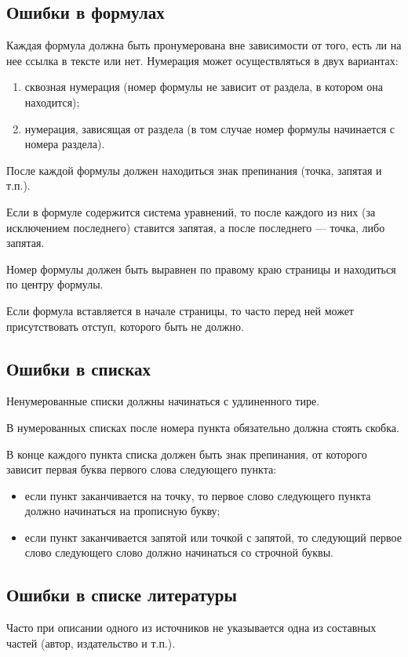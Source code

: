 \subsection{Ошибки в формулах}
Каждая формула должна быть пронумерована вне зависимости от того, есть ли на нее ссылка в тексте или нет. Нумерация может осуществляться в двух вариантах:
\begin{enumerate}
	\item сквозная нумерация (номер формулы не зависит от раздела, в котором она находится);
	\item нумерация, зависящая от раздела (в том случае номер формулы начинается с номера раздела).
\end{enumerate}

После каждой формулы должен находиться знак препинания (точка, запятая и т.п.).

Если в формуле содержится система уравнений, то после каждого из них (за исключением последнего) ставится запятая, а после последнего --- точка, либо запятая.

Номер формулы должен быть выравнен по правому краю страницы и находиться по центру формулы.

Если формула вставляется в начале страницы, то часто перед ней может присутствовать отступ, которого быть не должно.

\subsection{Ошибки в списках}
Ненумерованные списки должны начинаться с удлиненного тире.

В нумерованных списках после номера пункта обязательно должна стоять скобка.

В конце каждого пункта списка должен быть знак препинания, от которого зависит первая буква первого слова следующего пункта:
\begin{itemize}
	\item если пункт заканчивается на точку, то первое слово следующего пункта должно начинаться на прописную букву;
	\item если пункт заканчивается запятой или точкой с запятой, то следующий первое слово следующего слово должно начинаться со строчной буквы.
\end{itemize}

\subsection{Ошибки в списке литературы}
Часто при описании одного из источников не указывается одна из составных частей (автор, издательство и т.п.).

